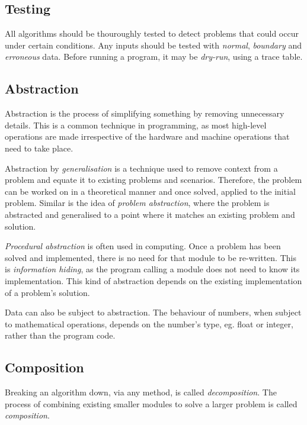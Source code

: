 \documentclass[9pt]{article}
\begin{document}
\subsection{Testing}
\label{sec:orgaaf6e8e}

All algorithms should be thouroughly tested to detect problems that could occur under certain conditions. Any inputs should be tested with \emph{normal}, \emph{boundary} and \emph{erroneous} data. Before running a program, it may be \emph{dry-run}, using a trace table.

\subsection{Abstraction}
\label{sec:orgf11e970}

Abstraction is the process of simplifying something by removing unnecessary details. This is a common technique in programming, as most high-level operations are made irrespective of the hardware and machine operations that need to take place.

Abstraction by \emph{generalisation} is a technique used to remove context from a problem and equate it to existing problems and scenarios. Therefore, the problem can be worked on in a theoretical manner and once solved, applied to the initial problem. Similar is the idea of \emph{problem abstraction}, where the problem is abstracted and generalised to a point where it matches an existing problem and solution.

\emph{Procedural abstraction} is often used in computing. Once a problem has been solved and implemented, there is no need for that module to be re-written. This is \emph{information hiding}, as the program calling a module does not need to know its implementation. This kind of abstraction depends on the existing implementation of a problem's solution.

Data can also be subject to abstraction. The behaviour of numbers, when subject to mathematical operations, depends on the number's type, eg. float or integer, rather than the program code.

\subsection{Composition}
\label{sec:orge615888}

Breaking an algorithm down, via any method, is called \emph{decomposition}. The process of combining existing smaller modules to solve a larger problem is called \emph{composition}.
\end{document}
